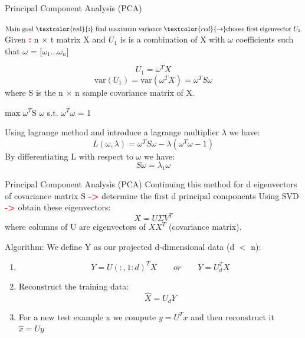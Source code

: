 \documentclass[10pt]{beamer}
\begin{document}
\begin{frame}{Principal Component Analysis (PCA)}

     $\hbox{Main goal \textcolor{red}{\textbf{:}} find maximum variance } \textcolor{red}{\rightarrow} \hbox{choose first eigenvector $U_1$}$
	Given \textcolor{red}{\textbf{:}} n $\times$ t matrix X and $U_1$ is is a combination of X with $\omega$ coefficients such that $\omega$ = [$\omega_1 \ldots \omega_n$]
    
\begin{equation}
U_1 = \omega^T X 
\end{equation}
\begin{equation}
\text{var}(U_1) = \text{var}(\omega^T X) = \omega^T S \omega
\end{equation}
where S is the n $\times$ n sample covariance matrix of X. 
\begin{center}  
max  $\omega^T$S $\omega$ \space \space s.t. $\omega^T \omega$ = 1 
\end{center}
Using lagrange method and introduce a lagrange multiplier $\lambda$ we have:
\begin{equation}
L(\omega, \lambda) = \omega^T S \omega - \lambda(\omega^T \omega - 1)
\end{equation}
By differentiating L with respect to $\omega$ we have:
\begin{equation}
S\omega = \lambda_1\omega
\end{equation}
\end{frame}

\begin{frame}{Principal Component Analysis (PCA)}
Continuing this method for d eigenvectors of covariance matrix S  \textcolor{red}{\textbf{->}} determine the first d principal components
Using SVD  \textcolor{red}{\textbf{->}} obtain these eigenvectors:
\begin{equation}
X = U \Sigma V^T
\end{equation}
where columns of U are eigenvectors of $XX^T$ (covariance matrix).

Algorithm:
We define Y as our projected d-dimensional data (d $<$ n):
\begin{enumerate}
\item {\begin{equation}
Y = U(:, 1:d)^T X \qquad or \qquad Y = U_d^T X
\end{equation}}
\item {Reconstruct the training data:\begin{equation} \hat{X} = U_d Y
\end{equation}}
\item {For a new test example x we compute $y = U^T x$ and then reconstruct it $\hat{x} = U y$ }
\end{enumerate}

\end{frame}	
\end{document}
